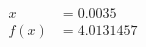 \documentclass[preview]{standalone}
\begin{document}
\begin{align*}
x &= 0.0035\\f(x) &= 4.0131457
\end{align*}
\end{document}

